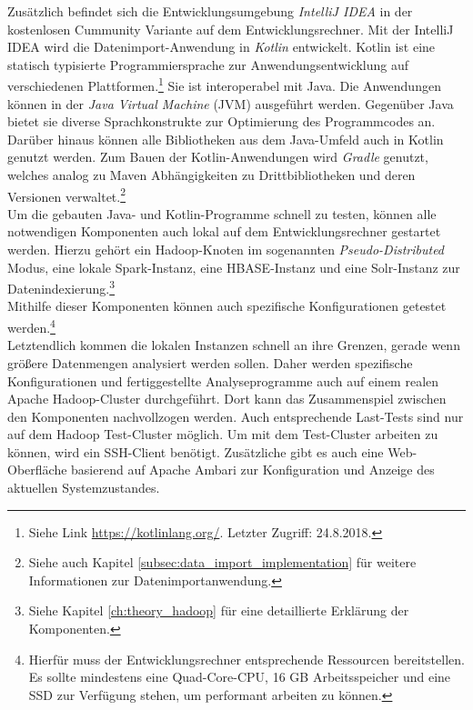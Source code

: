 \noindent
Zusätzlich befindet sich die Entwicklungsumgebung \textit{IntelliJ IDEA} in der kostenlosen Cummunity Variante  auf dem Entwicklungsrechner. Mit der IntelliJ IDEA wird die Datenimport-Anwendung in \textit{Kotlin} entwickelt. Kotlin ist eine statisch typisierte Programmiersprache zur Anwendungsentwicklung auf verschiedenen Plattformen.\footnote{Siehe Link \url{https://kotlinlang.org/}. Letzter Zugriff: 24.8.2018.} Sie ist interoperabel mit Java. Die Anwendungen können in der \textit{Java Virtual Machine} (JVM) ausgeführt werden. Gegenüber Java bietet sie diverse Sprachkonstrukte zur Optimierung des Programmcodes an. Darüber hinaus können alle Bibliotheken aus dem Java-Umfeld auch in Kotlin genutzt werden. Zum Bauen der Kotlin-Anwendungen wird \textit{Gradle} genutzt, welches analog zu Maven Abhängigkeiten zu Drittbibliotheken und deren Versionen verwaltet.\footnote{Siehe auch Kapitel \ref{subsec:data_import_implementation} für weitere Informationen zur Datenimportanwendung.}\\


\noindent
Um die gebauten Java- und Kotlin-Programme schnell zu testen, können alle notwendigen Komponenten auch lokal auf dem Entwicklungsrechner gestartet werden. Hierzu gehört ein Hadoop-Knoten im sogenannten \textit{Pseudo-Distributed} Modus, eine lokale Spark-Instanz, eine HBASE-Instanz und eine Solr-Instanz zur Datenindexierung.\footnote{Siehe Kapitel \ref{ch:theory_hadoop} für eine detaillierte Erklärung der Komponenten.}\\
Mithilfe dieser Komponenten können auch spezifische Konfigurationen getestet werden.\footnote{Hierfür muss der Entwicklungsrechner entsprechende Ressourcen bereitstellen. Es sollte mindestens eine Quad-Core-CPU, 16 GB Arbeitsspeicher und eine SSD zur Verfügung stehen, um performant arbeiten zu können.} \\
Letztendlich kommen die lokalen Instanzen schnell an ihre Grenzen, gerade wenn größere Datenmengen analysiert werden sollen. Daher werden spezifische Konfigurationen und fertiggestellte Analyseprogramme auch auf einem realen
Apache Hadoop-Cluster durchgeführt. Dort kann das Zusammenspiel zwischen den Komponenten nachvollzogen werden. Auch entsprechende Last-Tests sind nur auf dem Hadoop Test-Cluster möglich. Um mit dem Test-Cluster arbeiten zu können, wird ein SSH-Client benötigt. Zusätzliche gibt es auch eine Web-Oberfläche basierend auf Apache Ambari zur Konfiguration und Anzeige des aktuellen Systemzustandes.\\

